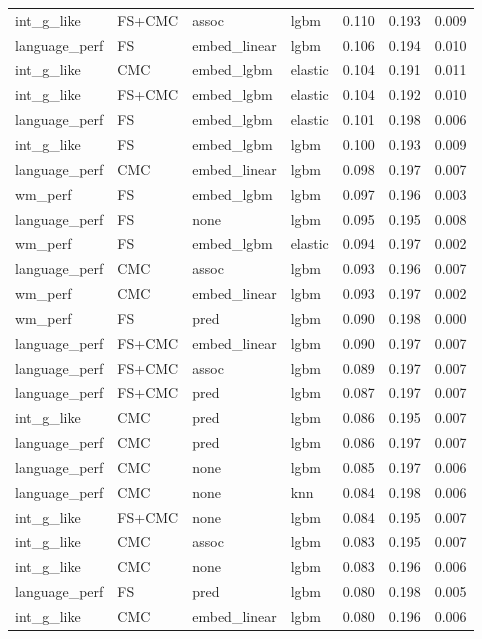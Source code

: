 \documentclass{article}
\begin{document}
\begin{longtable}{llllrrr}
	int\_g\_like & FS+CMC & assoc & lgbm & 0.110 & 0.193 & 0.009 \\
	language\_perf & FS & embed\_linear & lgbm & 0.106 & 0.194 & 0.010 \\
	int\_g\_like & CMC & embed\_lgbm & elastic & 0.104 & 0.191 & 0.011 \\
	int\_g\_like & FS+CMC & embed\_lgbm & elastic & 0.104 & 0.192 & 0.010 \\
	language\_perf & FS & embed\_lgbm & elastic & 0.101 & 0.198 & 0.006 \\
	int\_g\_like & FS & embed\_lgbm & lgbm & 0.100 & 0.193 & 0.009 \\
	language\_perf & CMC & embed\_linear & lgbm & 0.098 & 0.197 & 0.007 \\
	wm\_perf & FS & embed\_lgbm & lgbm & 0.097 & 0.196 & 0.003 \\
	language\_perf & FS & none & lgbm & 0.095 & 0.195 & 0.008 \\
	wm\_perf & FS & embed\_lgbm & elastic & 0.094 & 0.197 & 0.002 \\
	language\_perf & CMC & assoc & lgbm & 0.093 & 0.196 & 0.007 \\
	wm\_perf & CMC & embed\_linear & lgbm & 0.093 & 0.197 & 0.002 \\
	wm\_perf & FS & pred & lgbm & 0.090 & 0.198 & 0.000 \\
	language\_perf & FS+CMC & embed\_linear & lgbm & 0.090 & 0.197 & 0.007 \\
	language\_perf & FS+CMC & assoc & lgbm & 0.089 & 0.197 & 0.007 \\
	language\_perf & FS+CMC & pred & lgbm & 0.087 & 0.197 & 0.007 \\
	int\_g\_like & CMC & pred & lgbm & 0.086 & 0.195 & 0.007 \\
	language\_perf & CMC & pred & lgbm & 0.086 & 0.197 & 0.007 \\
	language\_perf & CMC & none & lgbm & 0.085 & 0.197 & 0.006 \\
	language\_perf & CMC & none & knn & 0.084 & 0.198 & 0.006 \\
	int\_g\_like & FS+CMC & none & lgbm & 0.084 & 0.195 & 0.007 \\
	int\_g\_like & CMC & assoc & lgbm & 0.083 & 0.195 & 0.007 \\
	int\_g\_like & CMC & none & lgbm & 0.083 & 0.196 & 0.006 \\
	language\_perf & FS & pred & lgbm & 0.080 & 0.198 & 0.005 \\
	int\_g\_like & CMC & embed\_linear & lgbm & 0.080 & 0.196 & 0.006 \\

\end{longtable}
\end{document}
